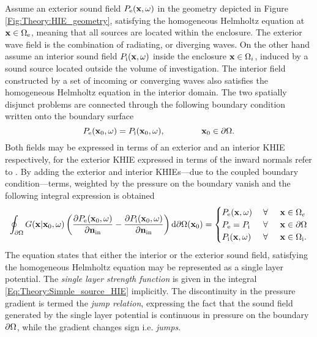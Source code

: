 Assume an exterior sound field $P_{\mathrm{e}}(\mathbf{x},\omega)$ in the geometry depicted in Figure \ref{Fig:Theory:HIE_geometry}, satisfying the homogeneous Helmholtz equation at $\mathbf{x} \in \Omega_{\mathrm{e}}$, meaning that all sources are located within the enclosure. 
The exterior wave field is the combination of radiating, or diverging waves. 
On the other hand assume an interior sound field $P_{\mathrm{i}}(\mathbf{x},\omega)$ inside the enclosure $\mathbf{x} \in \Omega_i$, induced by a sound source located outside the volume of investigation.
The interior field constructed by a set of incoming or converging waves also satisfies the homogeneous Helmholtz equation in the interior domain.
The two spatially disjunct problems are connected through the following boundary condition written onto the boundary surface
\begin{equation}
P_{\mathrm{e}}(\vxo,\omega) = P_{\mathrm{i}}(\vxo,\omega), \hspace{15mm} \vxo \in \dO.
\end{equation}
Both fields may be expressed in terms of an exterior and an interior KHIE respectively, for the exterior KHIE expressed in terms of the inward normals refer to \cite[eq. 8.30]{Williams1999}.
By adding the exterior and interior KHIEs---due to the coupled boundary condition---terms, weighted by the pressure on the boundary vanish and the following integral expression is obtained \cite{Courant1962, Kellogg1967, Williams1999}
\begin{equation}
\oint_{\partial \Omega} 
G(\mathbf{x}|\mathbf{x}_0,\omega) 
\left(
\frac{\partial P_{\mathrm{e}}(\mathbf{x}_0,\omega)}{\partial \mathbf{n}_{\mathrm{in}}} - \frac{\partial P_{\mathrm{i}}(\mathbf{x}_0,\omega)}{\partial \mathbf{n}_{\mathrm{in}}} 
\right)
\mathrm{d} \partial \Omega ( \mathbf{x}_0)
= 
\begin{cases} 
P_{\mathrm{e}}(\mathbf{x},\omega)           & \hspace{1mm} \forall \hspace{5mm}  \mathbf{x} \in \Omega_e  	   \\
P_{\mathrm{e}}=P_{\mathrm{i}} & \hspace{1mm} \forall \hspace{5mm}         \mathbf{x} \in \partial \Omega  \\
P_{\mathrm{i}}(\mathbf{x},\omega) 			& \hspace{1mm} \forall \hspace{5mm}   \mathbf{x} \in \Omega_{\mathrm{i}}.
\end{cases}
\label{Eq:Theory:Simple_source_HIE}
\end{equation}
The equation states that either the interior or the exterior sound field, satisfying the homogeneous Helmholtz equation may be represented as a single layer potential.
The \emph{single layer strength function} is given in the integral \eqref{Eq:Theory:Simple_source_HIE} implicitly.
The discontinuity in the pressure gradient is termed the \emph{jump relation}, expressing the fact that the sound field generated by the single layer potential is continuous in pressure on the boundary $\partial \Omega$, while the gradient changes sign i.e. \emph{jumps}.

